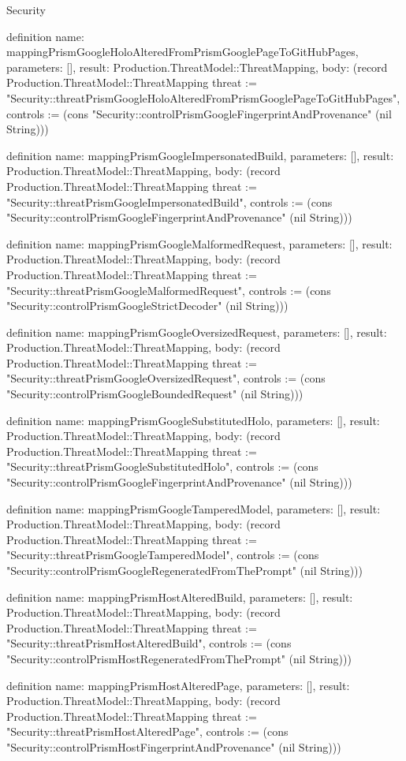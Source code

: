 \begin{lexlean}{Security}
\begin{semanticmodule}
definition{
  name: mappingPrismGoogleHoloAlteredFromPrismGooglePageToGitHubPages,
  parameters: [],
  result: Production.ThreatModel::ThreatMapping,
  body: (record Production.ThreatModel::ThreatMapping {threat := "Security::threatPrismGoogleHoloAlteredFromPrismGooglePageToGitHubPages", controls := (cons "Security::controlPrismGoogleFingerprintAndProvenance" (nil String))})
}

definition{
  name: mappingPrismGoogleImpersonatedBuild,
  parameters: [],
  result: Production.ThreatModel::ThreatMapping,
  body: (record Production.ThreatModel::ThreatMapping {threat := "Security::threatPrismGoogleImpersonatedBuild", controls := (cons "Security::controlPrismGoogleFingerprintAndProvenance" (nil String))})
}

definition{
  name: mappingPrismGoogleMalformedRequest,
  parameters: [],
  result: Production.ThreatModel::ThreatMapping,
  body: (record Production.ThreatModel::ThreatMapping {threat := "Security::threatPrismGoogleMalformedRequest", controls := (cons "Security::controlPrismGoogleStrictDecoder" (nil String))})
}

definition{
  name: mappingPrismGoogleOversizedRequest,
  parameters: [],
  result: Production.ThreatModel::ThreatMapping,
  body: (record Production.ThreatModel::ThreatMapping {threat := "Security::threatPrismGoogleOversizedRequest", controls := (cons "Security::controlPrismGoogleBoundedRequest" (nil String))})
}

definition{
  name: mappingPrismGoogleSubstitutedHolo,
  parameters: [],
  result: Production.ThreatModel::ThreatMapping,
  body: (record Production.ThreatModel::ThreatMapping {threat := "Security::threatPrismGoogleSubstitutedHolo", controls := (cons "Security::controlPrismGoogleFingerprintAndProvenance" (nil String))})
}

definition{
  name: mappingPrismGoogleTamperedModel,
  parameters: [],
  result: Production.ThreatModel::ThreatMapping,
  body: (record Production.ThreatModel::ThreatMapping {threat := "Security::threatPrismGoogleTamperedModel", controls := (cons "Security::controlPrismGoogleRegeneratedFromThePrompt" (nil String))})
}

definition{
  name: mappingPrismHostAlteredBuild,
  parameters: [],
  result: Production.ThreatModel::ThreatMapping,
  body: (record Production.ThreatModel::ThreatMapping {threat := "Security::threatPrismHostAlteredBuild", controls := (cons "Security::controlPrismHostRegeneratedFromThePrompt" (nil String))})
}

definition{
  name: mappingPrismHostAlteredPage,
  parameters: [],
  result: Production.ThreatModel::ThreatMapping,
  body: (record Production.ThreatModel::ThreatMapping {threat := "Security::threatPrismHostAlteredPage", controls := (cons "Security::controlPrismHostFingerprintAndProvenance" (nil String))})
}


\end{semanticmodule}
\end{lexlean}
